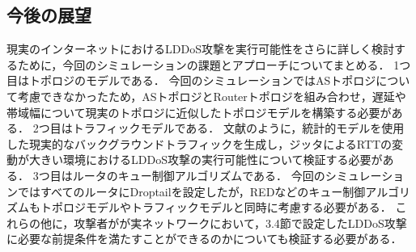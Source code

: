 \documentclass[Japanese]{dicomopapers}
\begin{document}
\subsection{今後の展望}
現実のインターネットにおけるLDDoS攻撃を実行可能性をさらに詳しく検討するために，今回のシミュレーションの課題とアプローチについてまとめる．
1つ目はトポロジのモデルである．
今回のシミュレーションではASトポロジについて考慮できなかったため，ASトポロジとRouterトポロジを組み合わせ，遅延や帯域幅について現実のトポロジに近似したトポロジモデルを構築する必要がある．
2つ目はトラフィックモデルである．
文献\cite{random-flow-ddos}のように，統計的モデルを使用した現実的なバックグラウンドトラフィックを生成し，ジッタによるRTTの変動が大きい環境におけるLDDoS攻撃の実行可能性について検証する必要がある．
3つ目はルータのキュー制御アルゴリズムである．
今回のシミュレーションではすべてのルータにDroptailを設定したが，REDなどのキュー制御アルゴリズムもトポロジモデルやトラフィックモデルと同時に考慮する必要がある．
これらの他に，攻撃者がが実ネットワークにおいて，3.4節で設定したLDDoS攻撃に必要な前提条件を満たすことができるのかについても検証する必要がある．
\end{document}
